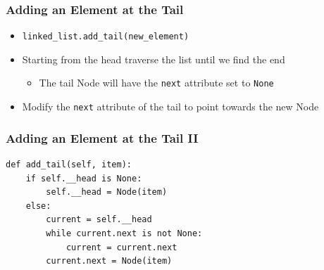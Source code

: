 \documentclass[11pt]{beamer}
\begin{document}
	\begin{frame}
		\frametitle{Adding an Element at the Tail}
		\begin{itemize}
			\item \lstinline|linked_list.add_tail(new_element)|
			\item Starting from the head traverse the list until we find the end
			\begin{itemize}
				\item The tail Node will have the \texttt{next} attribute set to \lstinline|None|
			\end{itemize}
			\item Modify the \texttt{next} attribute of the tail to point towards the new Node
		\end{itemize}
		\vspace{0.7cm}
		\begin{center}
		\end{center}
	\end{frame}

	\begin{frame}[fragile]
		\frametitle{Adding an Element at the Tail II}
\begin{lstlisting}
def add_tail(self, item):
	if self.__head is None:
		self.__head = Node(item)
	else:
		current = self.__head
		while current.next is not None:
			current = current.next
		current.next = Node(item)
\end{lstlisting}
\end{frame}
\end{document}
